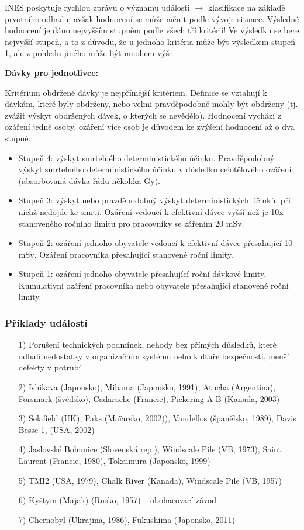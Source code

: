 INES poskytuje rychlou zprávu o významu události $\rightarrow$ klasifikace na základě prvotního odhadu, avšak hodnocení se může měnit podle vývoje situace. Výsledné hodnocení je dáno nejvyšším stupněm podle všech tří kritérií! Ve výsledku se bere nejvyšší stupeň, a to z důvodu, že u jednoho kritéria může být výsledkem stupeň 1, ale z pohledu jiného může být mnohem výše.

\textbf{Dávky pro jednotlivce:}

Kritérium obdržené dávky je nejpřímější kritériem. Definice se vztahují k dávkám, které byly obdrženy, nebo velmi pravděpodobně mohly být obdrženy (tj. zvážit výskyt obdržených dávek, o kterých se nevědělo). Hodnocení vychází z ozáření jedné osoby, ozáření více osob je důvodem ke zvýšení hodnocení až o dva stupně.

\begin{itemize}
    \item Stupeň 4: výskyt smrtelného deterministického účinku. 
    Pravděpodobný výskyt smrtelného deterministického účinku v důsledku celotělového ozáření (absorbovaná dávka řádu několika Gy).
    \item Stupeň 3: výskyt nebo pravděpodobný výskyt deterministických účinků, při nichž nedojde ke smrti.
    Ozáření vedoucí k efektivní dávce vyšší než je 10x stanoveného ročního limitu pro pracovníky se zářením 20 mSv.
    \item Stupeň 2: ozáření jednoho obyvatele vedoucí k efektivní dávce přesahující 10 mSv.
    Ozáření pracovníka přesahující stanovené roční limity.
    \item Stupeň 1: ozáření jednoho obyvatele přesahující roční dávkové limity.
    Kumulativní ozáření pracovníka nebo obyvatele přesahující stanovené roční limity.
\end{itemize}

\subsubsection{Příklady událostí}

\begin{itemize}
	\item[1)] Porušení technických podmínek, nehody bez přímých důsledků, které odhalí nedostatky v organizačním systému nebo kultuře bezpečnosti, menší defekty v potrubí.
	\item[2)] Ishikava (Japonsko), Mihama (Japonsko, 1991), Atucha (Argentina), Forsmark (švédsko), Cadarache (Francie), Pickering A-B (Kanada, 2003)
	\item[3)] Selafield (UK), Paks (Maïarsko, 2002)), Vandellos (španělsko, 1989), Davis Besse-1, (USA, 2002)
	\item[4)] Jaslovské Bohunice (Slovenská rep.), Windscale Pile (VB, 1973), Saint Laurent (Francie, 1980), Tokaimura (Japonsko, 1999)
	\item[5)] TMI2 (USA, 1979), Chalk River (Kanada), Windscale Pile (VB, 1957)
	\item[6)] Kyštym (Majak) (Rusko, 1957) -- obohacovací závod
	\item[7)] Chernobyl (Ukrajina, 1986), Fukushima (Japonsko, 2011)
\end{itemize}

